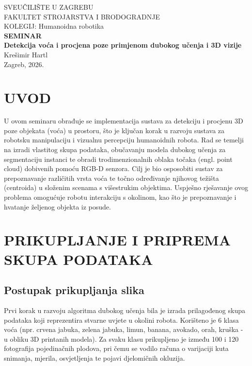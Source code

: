\documentclass[12pt,a4paper]{article}
\begin{document}
\begin{titlepage}
    \begin{center}
        {\large SVEUČILIŠTE U ZAGREBU} \\
        {\large FAKULTET STROJARSTVA I BRODOGRADNJE} \\
        \vspace{6cm}
        {\large KOLEGIJ: Humanoidna robotika} \\
        \vspace{2cm}
        {\Huge \textbf{SEMINAR}} \\
        \vspace{1cm}
        {\Large \textbf{Detekcija voća i procjena poze primjenom dubokog učenja i 3D vizije}} \\
        \vfill
        {\large Krešimir Hartl} \\
        \vspace{2cm}
        {\large Zagreb, 2026.}
    \end{center}
\end{titlepage}

\tableofcontents
\newpage
\listoffigures
\newpage
\listoftables
\newpage


\section{UVOD}
U ovom seminaru obrađuje se implementacija sustava za detekciju i procjenu 3D poze objekata (voća) u prostoru, što je ključan korak u razvoju sustava za robotsku manipulaciju i vizualnu percepciju humanoidnih robota. Rad se temelji na izradi vlastitog skupa podataka, obučavanju modela dubokog učenja za segmentaciju instanci te obradi trodimenzionalnih oblaka točaka (engl. point cloud) dobivenih pomoću RGB-D senzora. Cilj je bio osposobiti sustav za prepoznavanje različitih vrsta voća te točno određivanje njihovog težišta (centroida) u složenim scenama s višestrukim objektima. Uspješno rješavanje ovog problema omogućuje robotu interakciju s okolinom, kao što je prepoznavanje i hvatanje željenog objekta iz posude.

\section{PRIKUPLJANJE I PRIPREMA SKUPA PODATAKA}

\subsection{Postupak prikupljanja slika}
Prvi korak u razvoju algoritma dubokog učenja bila je izrada prilagođenog skupa podataka koji reprezentira stvarne uvjete u okolini robota. Korišteno je 6 klasa voća (npr. crvena jabuka, zelena jabuka, limun, banana, avokado, orah, kruška - u obliku 3D printanih modela). Za svaku klasu prikupljeno je između 100 i 120 fotografija pojedinačnih plodova, pri čemu se vodilo računa o varijaciji kuta snimanja, mjerila, osvjetljenja te pojavi djelomičnih okluzija.
\end{document}
